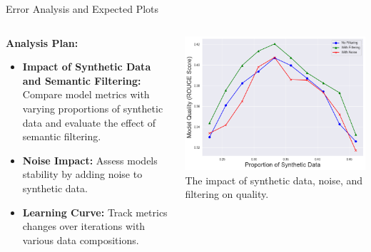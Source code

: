 \documentclass[12pt,pdf,hyperref={unicode}]{beamer}
\begin{document}
\begin{frame}{Error Analysis and Expected Plots}
    \footnotesize
    \begin{columns}[T]
        \begin{column}{0.4\textwidth}
            \textbf{Analysis Plan:}
            \begin{itemize}
                \item \textbf{Impact of Synthetic Data and Semantic Filtering:}
                      Compare model metrics with varying proportions of synthetic data and evaluate the effect of semantic filtering.
                \item \textbf{Noise Impact:}
                      Assess models stability by adding noise to synthetic data.
                \item \textbf{Learning Curve:}
                      Track metrics changes over iterations with various data compositions.
            \end{itemize}
        \end{column}
        \begin{column}{0.6\textwidth}
            \vspace{1cm}
            \includegraphics[width=\textwidth]{output.png}
            {\scriptsize The impact of synthetic data, noise, and filtering on quality.}

        \end{column}
    \end{columns}
\end{frame}
\end{document}
